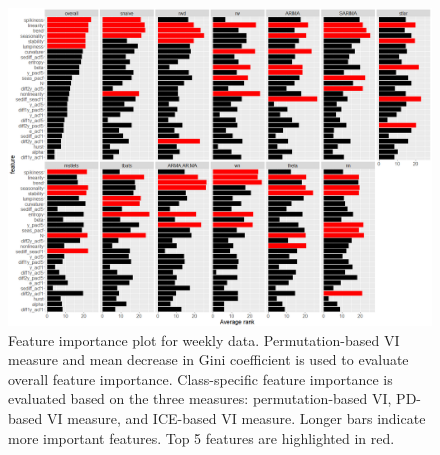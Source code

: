 \documentclass[11pt,a4paper,]{article}
\begin{document}
\begin{figure}[h]

{\centering \includegraphics{figures/viweekly-1} 

}

\caption{Feature importance plot for weekly data. Permutation-based VI measure and mean decrease in Gini coefficient is used to evaluate overall feature importance. Class-specific feature importance is evaluated based on the three measures: permutation-based VI, PD-based VI measure, and ICE-based VI measure. Longer bars indicate more important features. Top 5 features are highlighted in red.}\label{fig:viweekly}
\end{figure}
\end{document}
